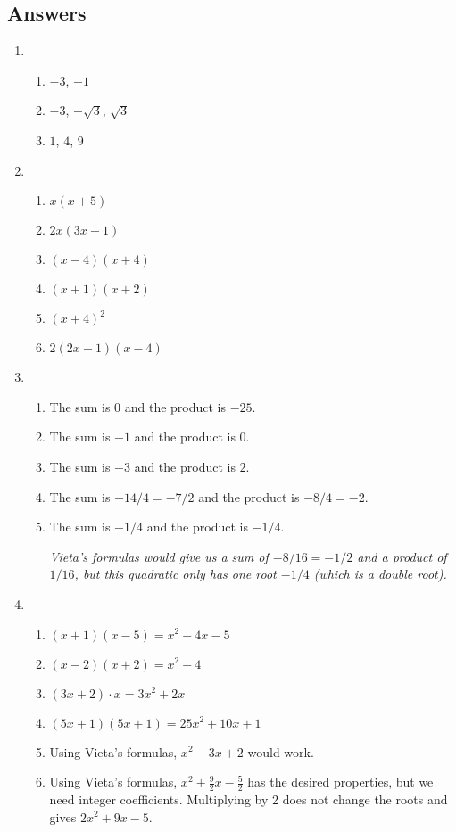\newpage
\subsection{Answers}

\begin{enumerate}
\item \begin{enumerate}
\item $-3$, $-1$
\item $-3$, $-\sqrt{3}$, $\sqrt{3}$
\item $1$, $4$, $9$
\end{enumerate}
\item \begin{enumerate}
\item $x(x + 5)$
\item $2x(3x + 1)$
\item $(x - 4)(x + 4)$
\item $(x + 1)(x + 2)$
\item $(x + 4)^2$
\item $2(2x - 1)(x - 4)$
\end{enumerate}
\item \begin{enumerate}
\item The sum is $0$ and the product is $-25$.
\item The sum is $-1$ and the product is $0$.
\item The sum is $-3$ and the product is $2$.
\item The sum is $-14/4 = -7/2$ and the product is $-8/4 = -2$.
\item The sum is $-1/4$ and the product is $-1/4$.\par
\emph{Vieta's formulas would give us a sum of $-8/16 = -1/2$ and a product of $1/16$, but this quadratic only has one root $-1/4$ (which is a double root).}
\end{enumerate}
\item \begin{enumerate}
\item $(x + 1)(x - 5) = \boxed{x^2 - 4x - 5}$
\item $(x - 2)(x + 2) = \boxed{x^2 - 4}$
\item $(3x + 2)\cdot x = \boxed{3x^2 + 2x}$
\item $(5x + 1)(5x + 1) = \boxed{25x^2 + 10x + 1}$
\item Using Vieta's formulas, $\boxed{x^2 - 3x + 2}$ would work.
\item Using Vieta's formulas, $x^2 + \frac{9}{2}x - \frac{5}{2}$ has the desired properties, but we need integer coefficients. Multiplying by 2 does not change the roots and gives $\boxed{2x^2 + 9x - 5}$.

\end{enumerate}
\end{enumerate}
